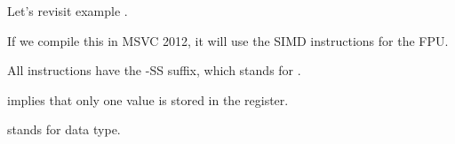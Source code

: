 \label{FPU_PRNG_SIMD}

Let's revisit  example .

If we compile this in MSVC 2012, it will use the SIMD instructions for the FPU.




All instructions have the -SS suffix, which stands for .

 implies that only one value is stored in the register.

 stands for \Tfloat data type.

